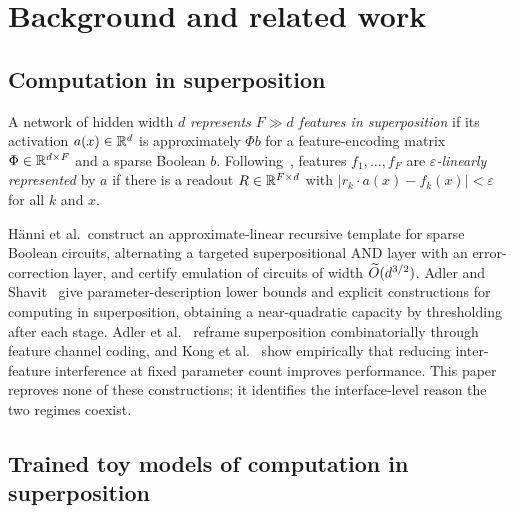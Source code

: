 \section{Background and related work}
\label{sec:background}

\subsection{Computation in superposition}

A network of hidden width $d$ \emph{represents $F\gg d$ features in superposition} if its
activation $a(x)\in\mathbb{R}^d$ is approximately $\Phi b$ for a feature-encoding matrix
$\Phi\in\mathbb{R}^{d\times F}$ and a sparse Boolean $b$. Following~\cite{hanni2024superposition},
features $f_1,\dots,f_F$ are \emph{$\varepsilon$-linearly represented} by $a$ if there is a
readout $R\in\mathbb{R}^{F\times d}$ with $|r_k\cdot a(x)-f_k(x)|<\varepsilon$ for all $k$ and $x$.

H\"{a}nni et al.\ construct an approximate-linear recursive template for sparse Boolean
circuits, alternating a targeted superpositional AND layer with an error-correction layer, and
certify emulation of circuits of width $\widetilde{O}(d^{3/2})$. Adler and
Shavit~\cite{adler2024superposition} give parameter-description lower bounds and explicit
constructions for computing in superposition, obtaining a near-quadratic capacity by
thresholding after each stage. Adler et al.~\cite{adler2025combinatorial} reframe superposition
combinatorially through feature channel coding, and Kong et al.~\cite{kong2025expand} show
empirically that reducing inter-feature interference at fixed parameter count improves
performance. This paper reproves none of these constructions; it identifies the interface-level
reason the two regimes coexist.

\subsection{Trained toy models of computation in superposition}

